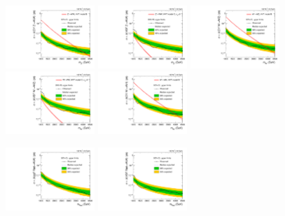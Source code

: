 \begin{figure}[htbp]
  \centering
  \includegraphics[width=0.3\textwidth]{fig/results/limits_ZprToWW_o_74.pdf}
  \includegraphics[width=0.3\textwidth]{fig/results/limits_VBFZprToWW_o_74.pdf}
  \includegraphics[width=0.3\textwidth]{fig/results/limits_WprToWZ_o_74.pdf}\\
  \includegraphics[width=0.3\textwidth]{fig/results/limits_VBFWprToWZ_o_74.pdf}
  \includegraphics[width=0.3\textwidth]{fig/results/limits_WprToWH_o_74.pdf}
  \caption{
  }
  \label{fig:exclusion_limits_spin1}
\end{figure}

\begin{figure}[htbp]
  \centering
  \includegraphics[width=0.3\textwidth]{fig/results/limits_RadToWW_o_74.pdf}
  \includegraphics[width=0.3\textwidth]{fig/results/limits_VBFRadToWW_o_74.pdf}
  \caption{
  }
  \label{fig:exclusion_limits_spin2}
\end{figure}

